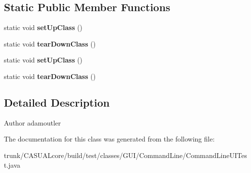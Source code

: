 \subsection*{Static Public Member Functions}
\begin{DoxyCompactItemize}
\item 
\hypertarget{class_g_u_i_1_1_command_line_1_1_command_line_u_i_test_a4a9b65b863c54e1f80612aa525e3a507}{static void {\bfseries set\-Up\-Class} ()}\label{class_g_u_i_1_1_command_line_1_1_command_line_u_i_test_a4a9b65b863c54e1f80612aa525e3a507}

\item 
\hypertarget{class_g_u_i_1_1_command_line_1_1_command_line_u_i_test_afb3be719a962ccfb8378e35c1f8f371d}{static void {\bfseries tear\-Down\-Class} ()}\label{class_g_u_i_1_1_command_line_1_1_command_line_u_i_test_afb3be719a962ccfb8378e35c1f8f371d}

\item 
\hypertarget{class_g_u_i_1_1_command_line_1_1_command_line_u_i_test_a4a9b65b863c54e1f80612aa525e3a507}{static void {\bfseries set\-Up\-Class} ()}\label{class_g_u_i_1_1_command_line_1_1_command_line_u_i_test_a4a9b65b863c54e1f80612aa525e3a507}

\item 
\hypertarget{class_g_u_i_1_1_command_line_1_1_command_line_u_i_test_afb3be719a962ccfb8378e35c1f8f371d}{static void {\bfseries tear\-Down\-Class} ()}\label{class_g_u_i_1_1_command_line_1_1_command_line_u_i_test_afb3be719a962ccfb8378e35c1f8f371d}

\end{DoxyCompactItemize}


\subsection{Detailed Description}
\begin{DoxyAuthor}{Author}
adamoutler 
\end{DoxyAuthor}


The documentation for this class was generated from the following file\-:\begin{DoxyCompactItemize}
\item 
trunk/\-C\-A\-S\-U\-A\-Lcore/build/test/classes/\-G\-U\-I/\-Command\-Line/Command\-Line\-U\-I\-Test.\-java\end{DoxyCompactItemize}
